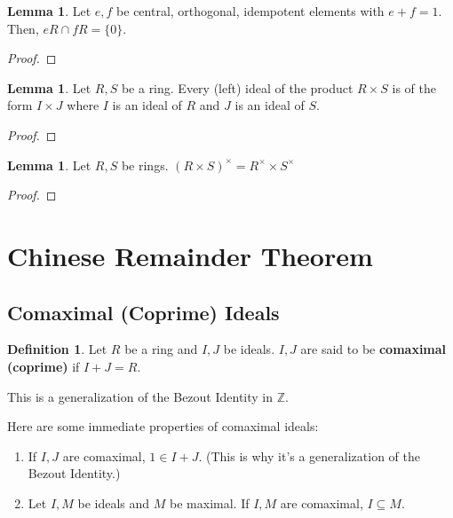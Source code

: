 \documentclass{article}
\theoremstyle{definition}
\newtheorem{definition}{Definition}
\newtheorem{lemma}[theorem]{Lemma}
\newcommand{\Z}{\mathbb{Z}}
\begin{document}
\begin{lemma}
    Let $e,f$ be central, orthogonal, idempotent elements with $e + f = 1$. Then, $eR \cap fR = \{0\}$.
\end{lemma}
\begin{proof}
    
\end{proof}

\begin{lemma}
    Let $R,S$ be a ring. Every (left) ideal of the product $R \times S$ is of the form 
    $I \times J$ where $I$ is an ideal of $R$ and $J$ is an ideal of $S$.
\end{lemma}
\begin{proof}
    
\end{proof}

\begin{lemma}\label{units_respects_products}
    Let $R,S$ be rings. $(R \times S)^{\times} = R^{\times} \times S^{\times}$
\end{lemma}
\begin{proof}
    
\end{proof}

\newpage

\section{Chinese Remainder Theorem}

\subsection{Comaximal (Coprime) Ideals}

\begin{definition}
    Let $R$ be a ring and $I,J$ be ideals. $I,J$ are said to be \textbf{comaximal (coprime)} 
    if $I + J = R$.
\end{definition}

This is a generalization of the Bezout Identity in $\Z$.

Here are some immediate properties of comaximal ideals:

\begin{enumerate}
    \item If $I,J$ are comaximal, $1 \in I + J$. (This is why it's a generalization of the Bezout Identity.)
    \item Let $I,M$ be ideals and $M$ be maximal. If $I,M$ are comaximal, $I \subseteq M$.
\end{enumerate}
\end{document}
